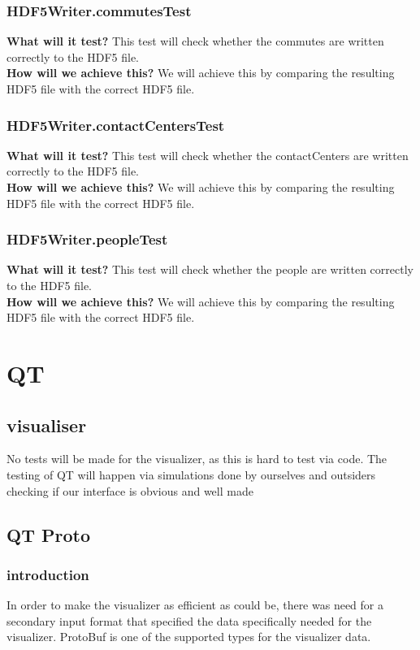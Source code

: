 \documentclass{article}
\begin{document}
\subsubsection{HDF5Writer.commutesTest}
\textbf{What will it test?}
This test will check whether the commutes are written correctly to the HDF5 file. \\
\newline 
\textbf{How will we achieve this?}
We will achieve this by comparing the resulting HDF5 file with the correct HDF5 file.

\subsubsection{HDF5Writer.contactCentersTest}
\textbf{What will it test?}
This test will check whether the contactCenters are written correctly to the HDF5 file. \\
\newline
\textbf{How will we achieve this?}
We will achieve this by comparing the resulting HDF5 file with the correct HDF5 file.

\subsubsection{HDF5Writer.peopleTest}
\textbf{What will it test?}
This test will check whether the people are written correctly to the HDF5 file. \\
\newline
\textbf{How will we achieve this?}
We will achieve this by comparing the resulting HDF5 file with the correct HDF5 file.
\section{QT}
\subsection{visualiser}
No tests will be made for the visualizer, as this is hard to test via code. The testing of QT will happen via simulations done by ourselves and outsiders checking if our interface is obvious and well made
\subsection{QT Proto}
\subsubsection{introduction}
In order to make the visualizer as efficient as could be, there was need for a secondary input format that specified the data specifically needed for the visualizer. ProtoBuf is one of the supported types for the visualizer data.
\end{document}
